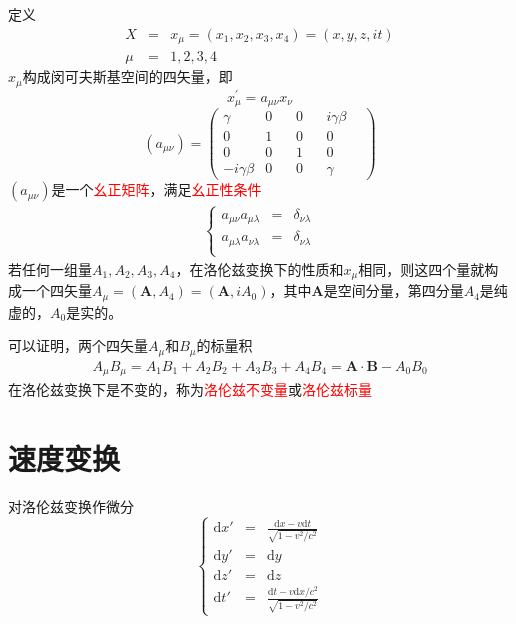 \documentclass[12pt,a4paper]{article}
\renewcommand{\vec}[1]{\boldsymbol{#1}}
\newcommand{\dif}{\mathrm{d}}
\begin{document}
定义
\begin{eqnarray}
\nonumber \nonumber X &=& x_{\mu} = (x_1, x_2, x_3, x_4) = (x, y, z, it) \\
\mu &=& 1, 2, 3, 4
\end{eqnarray}
$x_{\mu}$构成闵可夫斯基空间的四矢量，即
\begin{equation}
x^{\prime}_{\mu} = a_{\mu\nu} x_{\nu}
\end{equation}
\begin{equation*}
(a_{\mu\nu}) = 
\begin{pmatrix}
\gamma ~~~~& 0 ~~~~& 0 ~~~~& i\gamma \beta ~~~~\\
0 & 1 & 0 & 0 \\
0 & 0 & 1 & 0 \\
-i\gamma \beta & 0 & 0 & \gamma
\end{pmatrix}
\end{equation*}
$(a_{\mu\nu})$是一个\textcolor{red}{幺正矩阵}，满足\textcolor{red}{幺正性条件}
\begin{eqnarray}
\left\{ \begin{aligned}
 a_{\mu\nu} a_{\mu\lambda} &=& \delta_{\nu\lambda} \\
a_{\mu\lambda} a_{\nu\lambda} &=& \delta_{\nu\lambda} \\
\end{aligned} \right.
\end{eqnarray}
若任何一组量$A_1, A_2, A_3, A_4$，在洛伦兹变换下的性质和$x_{\mu}$相同，则这四个量就构成一个四矢量$A_{\mu} = (\vec{A}, A_4) = (\vec{A}, iA_0)$，其中$\vec{A}$是空间分量，第四分量$A_4$是纯虚的，$A_0$是实的。

可以证明，两个四矢量$A_{\mu}$和$B_{\mu}$的标量积
\begin{eqnarray}
A_{\mu} B_{\mu} = A_1 B_1 +A_2 B_2 +A_3 B_3 +A_4 B_4 = \vec{A}\cdot \vec{B} -A_0 B_0
\end{eqnarray}
在洛伦兹变换下是不变的，称为\textcolor{red}{洛伦兹不变量}或\textcolor{red}{洛伦兹标量}


\section{速度变换}
对洛伦兹变换作微分
\begin{equation}
\left\{
\begin{aligned}
\dif x' &=& \frac{\dif x -v\dif t}{\sqrt{1-v^2/c^2} } \\
\dif y' &=& \dif y \\
\dif z' &=& \dif z\\
\dif t' &=& \frac{\dif t -v\dif x/c^2 }{\sqrt{1-v^2/c^2} }
\end{aligned} \right.
\end{equation}
\end{document}
